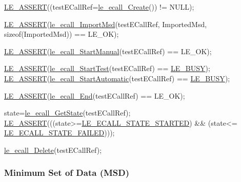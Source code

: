 \begin{DoxyCodeInclude}
    \hyperlink{le__log_8h_ac0dbbef91dc0fed449d0092ff0557b39}{LE\_ASSERT}((testECallRef=\hyperlink{le__ecall__interface_8h_aad7fa3b34d9d72a2f1d4baa681ba25cc}{le\_ecall\_Create}()) != NULL);

    \hyperlink{le__log_8h_ac0dbbef91dc0fed449d0092ff0557b39}{LE\_ASSERT}(\hyperlink{le__ecall__interface_8h_a7d8d8c1e1f49af2f6145836975d20aeb}{le\_ecall\_ImportMsd}(testECallRef, ImportedMsd, \textcolor{keyword}{sizeof}(ImportedMsd))
       == LE\_OK);

    \hyperlink{le__log_8h_ac0dbbef91dc0fed449d0092ff0557b39}{LE\_ASSERT}(\hyperlink{le__ecall__interface_8h_ab106c3ca87fc8dd8239d2849df932122}{le\_ecall\_StartManual}(testECallRef) == LE\_OK);

    \hyperlink{le__log_8h_ac0dbbef91dc0fed449d0092ff0557b39}{LE\_ASSERT}(\hyperlink{le__ecall__interface_8h_aa5d23a1bea370b1ae29fc52d7a89d947}{le\_ecall\_StartTest}(testECallRef) == 
      \hyperlink{le__basics_8h_a1cca095ed6ebab24b57a636382a6c86ca92b0367090993d8b41d1560663d01e8d}{LE\_BUSY});
    \hyperlink{le__log_8h_ac0dbbef91dc0fed449d0092ff0557b39}{LE\_ASSERT}(\hyperlink{le__ecall__interface_8h_aa25256eeacefcf00c14763ef294c7667}{le\_ecall\_StartAutomatic}(testECallRef) == 
      \hyperlink{le__basics_8h_a1cca095ed6ebab24b57a636382a6c86ca92b0367090993d8b41d1560663d01e8d}{LE\_BUSY});

    \hyperlink{le__log_8h_ac0dbbef91dc0fed449d0092ff0557b39}{LE\_ASSERT}(\hyperlink{le__ecall__interface_8h_a85800c86f9709fb7baa7219cc762181c}{le\_ecall\_End}(testECallRef) == LE\_OK);

    state=\hyperlink{le__ecall__interface_8h_a7881e794b9249222edde10f76d7663c9}{le\_ecall\_GetState}(testECallRef);
    \hyperlink{le__log_8h_ac0dbbef91dc0fed449d0092ff0557b39}{LE\_ASSERT}(((state>=\hyperlink{le__ecall__interface_8h_a233609e4724e549a1405f9177c0a07dda94ba7aacca9dfe74c4733515a7ba2c5e}{LE\_ECALL\_STATE\_STARTED}) && (state<=
      \hyperlink{le__ecall__interface_8h_a233609e4724e549a1405f9177c0a07dda5275385371c51e441a9eb97626c271b4}{LE\_ECALL\_STATE\_FAILED})));

    \hyperlink{le__ecall__interface_8h_af1221deb68c46912748f65505b3e4919}{le\_ecall\_Delete}(testECallRef);
\end{DoxyCodeInclude}
 \hypertarget{c_SDD_eCall_le_ecall_msd}{}\subsubsection{Minimum Set of Data (\+M\+S\+D)}\label{c_SDD_eCall_le_ecall_msd}
